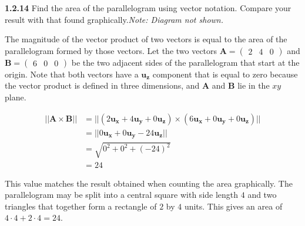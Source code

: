 \documentclass{article}
\begin{document}
\textbf{1.2.14} Find the area of the parallelogram using vector notation. Compare your result with that found
graphically.\@ \textit{Note: Diagram not shown.}

\vspace{24pt}

The magnitude of the vector product of two vectors is equal to the area of the parallelogram formed by those vectors.
Let the two vectors $\mathbf{A} = \begin{pmatrix} 2 & 4 & 0 \end{pmatrix}$ and $\mathbf{B} = \begin{pmatrix} 6 & 0 & 0
	\end{pmatrix}$ be the two adjacent sides of the parallelogram that start at the origin. Note that both vectors have a
$\mathbf{u_z}$ component that is equal to zero because the vector product is defined in three dimensions, and
$\mathbf{A}$ and $\mathbf{B}$ lie in the $xy$ plane.

\begin{equation*}
	\begin{split}
		||\mathbf{A} \times \mathbf{B}|| & = ||(2\mathbf{u_x} + 4\mathbf{u_y} + 0\mathbf{u_z}) \times (6\mathbf{u_x} + 0\mathbf{u_y} + 0\mathbf{u_z})|| \\
		& = ||0\mathbf{u_x} + 0\mathbf{u_y} - 24\mathbf{u_z}|| \\
		& = \sqrt{0^2 + 0^2 + {(-24)}^2} \\
		& = 24
	\end{split}
\end{equation*}

This value matches the result obtained when counting the area graphically. The parallelogram may be split into a central
square with side length $4$ and two triangles that together form a rectangle of $2$ by $4$ units. This gives an area of
$4 \cdot 4 + 2 \cdot 4 = 24$.
\end{document}
